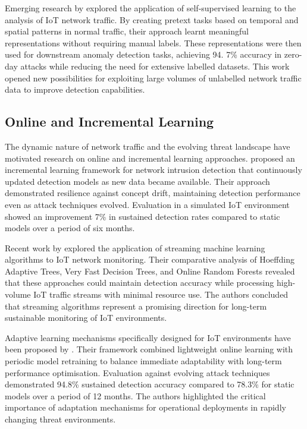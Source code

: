 Emerging research by \citet{Zhao2020} explored the application of self-supervised learning to the analysis of IoT network traffic. By creating pretext tasks based on temporal and spatial patterns in normal traffic, their approach learnt meaningful representations without requiring manual labels. These representations were then used for downstream anomaly detection tasks, achieving 94. 7\% accuracy in zero-day attacks while reducing the need for extensive labelled datasets. This work opened new possibilities for exploiting large volumes of unlabelled network traffic data to improve detection capabilities.

\subsection{Online and Incremental Learning}

The dynamic nature of network traffic and the evolving threat landscape have motivated research on online and incremental learning approaches. \citet{Karthikeyan2011} proposed an incremental learning framework for network intrusion detection that continuously updated detection models as new data became available. Their approach demonstrated resilience against concept drift, maintaining detection performance even as attack techniques evolved. Evaluation in a simulated IoT environment showed an improvement 7\% in sustained detection rates compared to static models over a period of six months.

Recent work by \citet{Ferrari2019} explored the application of streaming machine learning algorithms to IoT network monitoring. Their comparative analysis of Hoeffding Adaptive Trees, Very Fast Decision Trees, and Online Random Forests revealed that these approaches could maintain detection accuracy while processing high-volume IoT traffic streams with minimal resource use. The authors concluded that streaming algorithms represent a promising direction for long-term sustainable monitoring of IoT environments.

Adaptive learning mechanisms specifically designed for IoT environments have been proposed by \citet{Raza2019}. Their framework combined lightweight online learning with periodic model retraining to balance immediate adaptability with long-term performance optimisation. Evaluation against evolving attack techniques demonstrated 94.8\% sustained detection accuracy compared to 78.3\% for static models over a period of 12 months. The authors highlighted the critical importance of adaptation mechanisms for operational deployments in rapidly changing threat environments.

